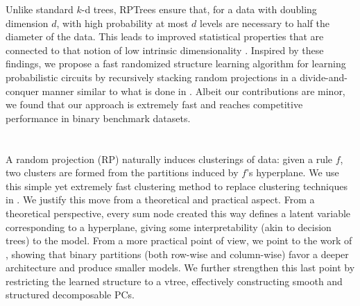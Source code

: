 Unlike standard $k$-d trees, RPTrees ensure that, for a data with doubling dimension $d$, with high
probability at most $d$ levels are necessary to half the diameter of the data. This leads to
improved statistical properties that are connected to that notion of low intrinsic dimensionality
\citep{dasgupta08b,dhesi10}. Inspired by these findings, we propose a fast randomized structure
learning algorithm for learning probabilistic circuits by recursively stacking random projections
in a divide-and-conquer manner similar to what is done in . Albeit our
contributions are minor, we found that our approach is extremely fast and reaches competitive
performance in binary benchmark datasets.

\section{}

A random projection (RP) naturally induces clusterings of data: given a rule $f$, two clusters are
formed from the partitions induced by $f$'s hyperplane. We use this simple yet extremely fast
clustering method to replace clustering techniques in . We justify this move
from a theoretical and practical aspect. From a theoretical perspective, every sum node created
this way defines a latent variable corresponding to a hyperplane, giving some interpretability
(akin to decision trees) to the model. From a more practical point of view, we point to the work
of \citet{vergari15}, showing that binary partitions (both row-wise and column-wise) favor a deeper
architecture and produce smaller models. We further strengthen this last point by restricting the
learned structure to a vtree, effectively constructing smooth and structured decomposable PCs.

